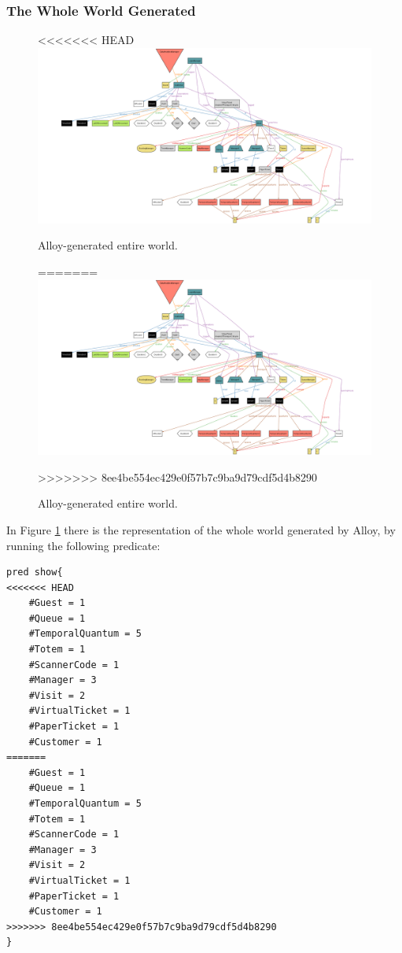 \documentclass[a4paper, 12pt, oneside]{article}
\begin{document}
\begin{enumerate}[labelindent=20pt, label={UC.\arabic*}, itemindent=1em,leftmargin=!]
\subsubsection{The Whole World Generated}
\begin{figure}[h!]
\centering
<<<<<<< HEAD
    \centering
    \includegraphics[height=0.35\textheight, scale=0.3, keepaspectratio]{img/alloy/alloy_entire_world.png}
    \caption{Alloy-generated entire world.}
    \label{alloy_entire_world}
=======
	\centering
  	\includegraphics[height=0.35\textheight, scale=0.3, keepaspectratio]{img/alloy/alloy_entire_world.png}
	\caption{Alloy-generated entire world.}
 	\label{alloy_entire_world}
>>>>>>> 8ee4be554ec429e0f57b7c9ba9d79cdf5d4b8290
\end{figure}

In Figure \ref{alloy_entire_world} there is the representation of the whole world generated by Alloy, by running the following predicate: 

\begin{lstlisting}[language=alloy]
pred show{
<<<<<<< HEAD
    #Guest = 1
    #Queue = 1
    #TemporalQuantum = 5
    #Totem = 1
    #ScannerCode = 1
    #Manager = 3
    #Visit = 2
    #VirtualTicket = 1
    #PaperTicket = 1
    #Customer = 1
=======
	#Guest = 1
	#Queue = 1
	#TemporalQuantum = 5
	#Totem = 1
	#ScannerCode = 1
	#Manager = 3
	#Visit = 2
	#VirtualTicket = 1
	#PaperTicket = 1
	#Customer = 1
>>>>>>> 8ee4be554ec429e0f57b7c9ba9d79cdf5d4b8290
}


\end{lstlisting}
\end{enumerate}
\end{document}
